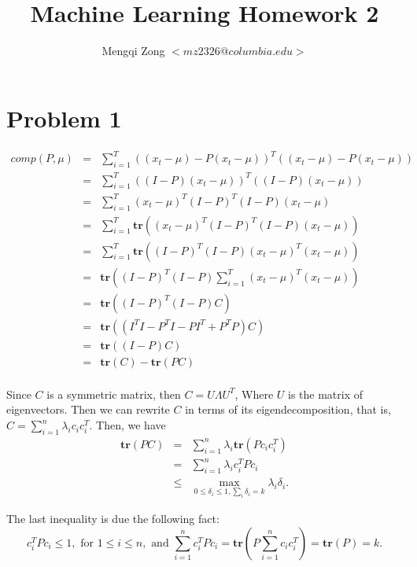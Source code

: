 \documentclass[12pt]{article}
\title{Machine Learning Homework 2}
\author{Mengqi Zong $<mz2326@columbia.edu>$}
\begin{document}
\maketitle

\setlength{\parindent}{0in}

\section*{Problem 1}

\begin{eqnarray*}
comp(P, \mu)
&=& \sum_{i=1}^T \left( (x_t - \mu) - P(x_t - \mu) \right)^T
  \left( (x_t - \mu) - P(x_t - \mu) \right) \\
&=& \sum_{i=1}^T \left( (I-P)(x_t - \mu) \right)^T
  \left( (I-P) (x_t - \mu) \right) \\
&=& \sum_{i=1}^T (x_t - \mu)^T (I-P)^T (I-P) (x_t - \mu) \\
&=& \sum_{i=1}^T \textbf{tr} \left( (x_t - \mu)^T (I-P)^T (I-P)
  (x_t - \mu) \right) \\
&=& \sum_{i=1}^T \textbf{tr} \left( (I-P)^T (I-P) (x_t - \mu)^T
  (x_t - \mu) \right) \\
&=& \textbf{tr} \left( (I-P)^T (I-P) \sum_{i=1}^T (x_t - \mu)^T
  (x_t - \mu) \right) \\
&=& \textbf{tr} \left( (I-P)^T (I-P) C \right) \\
&=& \textbf{tr} \left( (I^T I - P^T I - P I^T + P^TP) C \right) \\
&=& \textbf{tr} \left( (I - P) C \right) \\
&=& \textbf{tr} (C) - \textbf{tr} (PC) \\
\end{eqnarray*}

Since $C$ is a symmetric matrix, then $C = U \Lambda U^T$, Where $U$ is the matrix of eigenvectors. Then we can rewrite $C$ in terms of its eigendecomposition, that is,  $C = \sum_{i=1}^n \lambda_i c_i c_i^T$. Then, we have
\begin{eqnarray*}
  \textbf{tr}(PC)
  &=& \sum_{i=1}^n \lambda_i \textbf{tr}(P c_i c_i^T) \\
  &=& \sum_{i=1}^n \lambda_i c_i^T P c_i  \\
  &\le& \max_{0 \le \delta_i \le 1, \sum_i \delta_i = k} \lambda_i \delta_i.
\end{eqnarray*}

The last inequality is due the following fact:
\begin{equation*}
  c_i^T P c_i \le 1, \text{ for } 1 \le i \le n, \text{ and }
  \sum_{i=1}^{n} c_i^T P c_i = \textbf{tr} \left( P \sum_{i=1}^{n}
    c_i c_i^T \right) = \textbf{tr}(P) = k.
\end{equation*}
\end{document}
